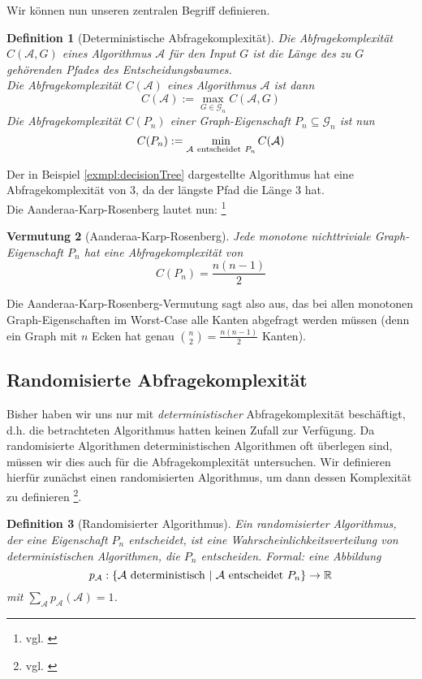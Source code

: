 \documentclass[a4paper]{scrreprt}
\newtheorem{definition}{Definition}
\newtheorem{conjecture}[definition]{Vermutung}
\theoremstyle{definition}
\begin{document}
Wir können nun unseren zentralen Begriff definieren.

\begin{definition}[Deterministische Abfragekomplexität]
Die \emph{Abfragekomplexität} $C(\mathcal{A},G)$ eines
Algorithmus $\mathcal{A}$ für den Input $G$ ist
die Länge des zu $G$ gehörenden Pfades des
Entscheidungsbaumes. \\
Die \emph{Abfragekomplexität} $C(\mathcal{A})$ eines
Algorithmus $\mathcal{A}$ ist dann
$$ C(\mathcal{A}) := \max_{G \in \mathcal{G}_n} C(\mathcal{A},G)$$
Die \emph{Abfragekomplexität} $C(P_n)$ einer Graph-Eigenschaft
$P_n\subseteq \mathcal{G}_n$ ist nun
$$ C(P_n) := \min_{\mathcal{A} \ {\rm entscheidet}\  P_n} C(\mathcal{A})$$
\end{definition}

Der in Beispiel \ref{exmpl:decisionTree} dargestellte
Algorithmus hat eine Abfragekomplexität von $3$, da
der längste Pfad die Länge $3$ hat. \\
Die Aanderaa-Karp-Rosenberg lautet nun:
\footnote{vgl. \cite[S.9]{Lovasz}}
\begin{conjecture}[Aanderaa-Karp-Rosenberg]
Jede monotone nichttriviale Graph-Eigenschaft $P_n$
hat eine Abfragekomplexität von
$$C(P_n) = \frac{n(n-1)}{2}$$
\end{conjecture}
Die Aanderaa-Karp-Rosenberg-Vermutung sagt also aus,
das bei allen monotonen Graph-Eigenschaften im Worst-Case
alle Kanten abgefragt werden müssen (denn ein Graph mit
$n$ Ecken hat genau ${\binom{n}{2}=\frac{n(n-1)}{2}}$ Kanten).

\subsection{Randomisierte Abfragekomplexität}

Bisher haben wir uns nur mit \emph{deterministischer}
Abfragekomplexität beschäftigt, d.h. die betrachteten
Algorithmus hatten keinen Zufall zur Verfügung.
Da randomisierte Algorithmen deterministischen Algorithmen
oft überlegen sind, müssen wir dies auch für
die Abfragekomplexität untersuchen.
Wir definieren hierfür zunächst einen randomisierten
Algorithmus, um dann dessen Komplexität zu definieren
\footnote{vgl. \cite[S.120]{Groeger}}.
\begin{definition}[Randomisierter Algorithmus]
Ein \emph{randomisierter Algorithmus}, der eine
Eigenschaft $P_n$ entscheidet, ist eine
Wahrscheinlichkeitsverteilung von deterministischen
Algorithmen, die $P_n$ entscheiden. Formal: eine Abbildung
$$ p_\mathcal{A}: \{ \mathcal{A} \ \textup {deterministisch} \ | \
         \mathcal{A} \ {\rm entscheidet} \ P_n \} \to \mathbb{R} $$
mit $\sum_\mathcal{A} p_\mathcal{A}(\mathcal{A}) = 1$.
\end{definition}
\end{document}
